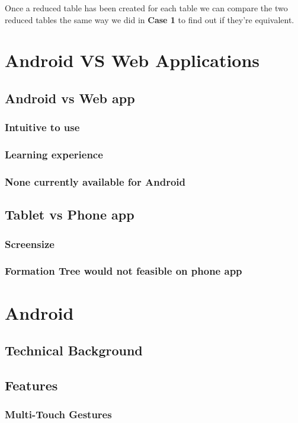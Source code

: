 \documentclass{report}
\begin{document}
Once a reduced table has been created for each table we can compare the two reduced tables the same way we did in \textbf{Case 1} to find out if they're equivalent.

\chapter{Android VS Web Applications}

\section{Android vs Web app}
\subsection{Intuitive to use}
\subsection{Learning experience}
\subsection{None currently available for Android}

\section{Tablet vs Phone app}
\subsection{Screensize}
\subsection{Formation Tree would not feasible on phone app}

\chapter{Android}

\section{Technical Background}

\section{Features}

\subsection{Multi-Touch Gestures}
\end{document}

